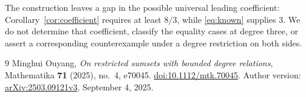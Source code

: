 \documentclass[11pt]{article}
\begin{document}
The construction leaves a gap in the possible universal leading coefficient: Corollary~\ref{cor:coefficient} requires at least $8/3$, while \eqref{eq:known} supplies $3$. We do not determine that coefficient, classify the equality cases at degree three, or assert a corresponding counterexample under a degree restriction on both sides.

\begin{thebibliography}{9}
Minghui Ouyang,
\emph{On restricted sumsets with bounded degree relations},
Mathematika \textbf{71} (2025), no.~4, e70045.
\href{https://doi.org/10.1112/mtk.70045}{doi:10.1112/mtk.70045}.
Author version: \href{https://arxiv.org/abs/2503.09121v3}{arXiv:2503.09121v3}, September 4, 2025.
\end{thebibliography}
\end{document}
